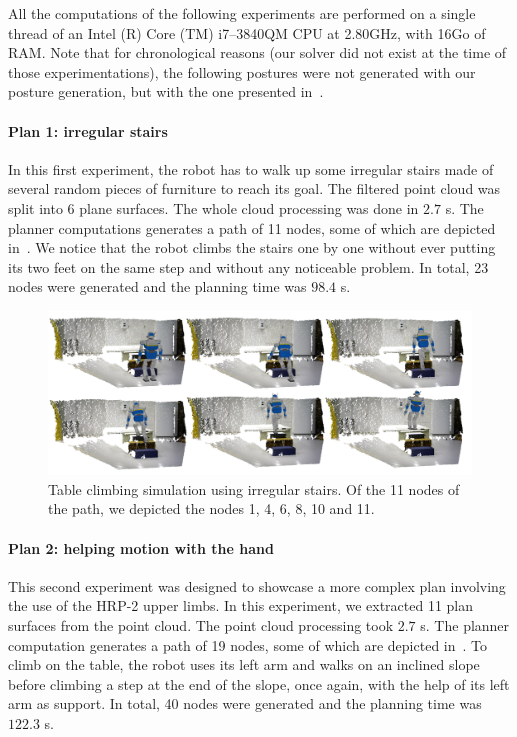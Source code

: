 All the computations of the following experiments are performed on a single thread of an Intel (R) Core (TM) i7--3840QM CPU at 2.80GHz, with 16Go of RAM\@.
Note that for chronological reasons (our solver did not exist at the time of those experimentations), the following postures were not generated with our posture generation, but with the one presented in~\cite{bouyarmane:ar:2012}.

\paragraph{Plan 1: irregular stairs}
In this first experiment, the robot has to walk up some irregular stairs made of several random pieces of furniture to reach its goal.
The filtered point cloud was split into 6 plane surfaces.
The whole cloud processing was done in $2.7$ s.
The planner computations generates a path of 11 nodes, some of which are depicted in~.
We notice that the robot climbs the stairs one by one without ever putting its two feet on the same step and without any noticeable problem.
In total, 23 nodes were generated and the planning time was $98.4$ s.

\begin{figure}
  \centering
  \includegraphics[width=\linewidth]{hrp2stairs.png}
  \caption{Table climbing simulation using irregular stairs. Of the 11 nodes of the path, we depicted the nodes 1, 4, 6, 8, 10 and 11.}
\label{fig:table-climbing-simulation-stair}
\end{figure}

\paragraph{Plan 2: helping motion with the hand}
This second experiment was designed to showcase a more complex plan involving the use of the HRP-2 upper limbs.
In this experiment, we extracted 11 plan surfaces from the point cloud.
The point cloud processing took $2.7$ s.
The planner computation generates a path of 19 nodes, some of which are depicted in~.
To climb on the table, the robot uses its left arm and walks on an inclined slope before climbing a step at the end of the slope, once again, with the help of its left arm as support.
In total, 40 nodes were generated and the planning time was $122.3$ s.

